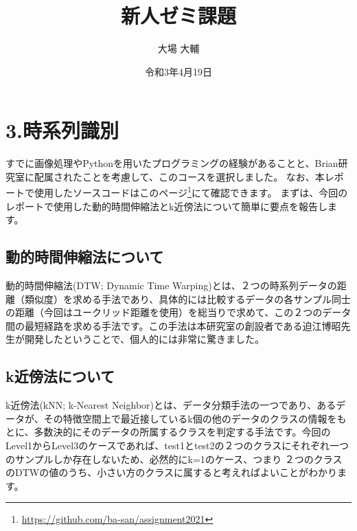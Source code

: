 




\graphicspath{{./pic/}}
\setlength{\textwidth}{16.2cm}%
\setlength{\textheight}{23cm}%
\setlength{\topmargin}{-1.5cm}
\setlength{\oddsidemargin}{0cm}
\setlength{\evensidemargin}{0cm}
\setlength{\parskip}{1pt}
\pagestyle{fancy}
\title{新人ゼミ課題}
\author{大場 大輔}
\date{令和3年4月19日}


	\maketitle
	\vspace*{20pt}

	
\section*{3.時系列識別}
すでに画像処理やPythonを用いたプログラミングの経験があることと、Brian研究室に配属されたことを考慮して、このコースを選択しました。
なお、本レポートで使用したソースコードはこのページ\footnote{\url{https://github.com/ba-san/assignment2021}}にて確認できます。
まずは、今回のレポートで使用した動的時間伸縮法とk近傍法について簡単に要点を報告します。

\subsection*{動的時間伸縮法について}
動的時間伸縮法(DTW; Dynamic Time Warping)とは、２つの時系列データの距離（類似度）を求める手法であり、具体的には比較するデータの各サンプル同士の距離（今回はユークリッド距離を使用）を総当りで求めて、この２つのデータ間の最短経路を求める手法です。この手法は本研究室の創設者である迫江博昭先生が開発したということで、個人的には非常に驚きました。

\subsection*{k近傍法について}
k近傍法(kNN; k-Nearest Neighbor)とは、データ分類手法の一つであり、あるデータが、その特徴空間上で最近接しているk個の他のデータのクラスの情報をもとに、多数決的にそのデータの所属するクラスを判定する手法です。今回のLevel1からLevel3のケースであれば、test1とtest2の２つのクラスにそれぞれ一つのサンプルしか存在しないため、必然的にk=1のケース、つまり
２つのクラスのDTWの値のうち、小さい方のクラスに属すると考えればよいことがわかります。

